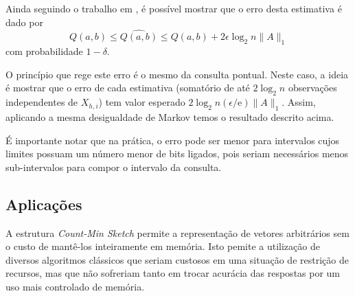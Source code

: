 Ainda seguindo o trabalho em \cite{cormode2005improved}, é possível mostrar que o erro desta estimativa é dado por
\[
    Q(a, b) \leq \widehat{Q(a, b)} \leq Q(a, b) + 2 \epsilon \log_2 n \lVert A \rVert_1
\]
com probabilidade $1-\delta$.

O princípio que rege este erro é o mesmo da consulta pontual. Neste caso, a ideia é mostrar que o erro de cada estimativa (somatório de até $2\log_2 n$ observações independentes de $X_{h,i}$) tem valor esperado $2 \log_2 n (\epsilon/\mathrm{e}) \lVert A \rVert_1$. Assim, aplicando a mesma desigualdade de Markov temos o resultado descrito acima. 

É importante notar que na prática, o erro pode ser menor para intervalos cujos limites possuam um número menor de bits ligados, pois seriam necessários menos sub-intervalos para compor o intervalo da consulta.

\subsection{Aplicações}

A estrutura \emph{Count-Min Sketch} permite a representação de vetores arbitrários sem o custo de mantê-los inteiramente em memória. Isto pemite a utilização de diversos algoritmos clássicos que seriam custosos em uma situação de restrição de recursos, mas que não sofreriam tanto em trocar acurácia das respostas por um uso mais controlado de memória.

